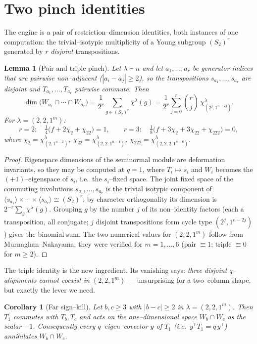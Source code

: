 \documentclass[11pt]{article}
\newtheorem{lemma}[theorem]{Lemma}
\newtheorem{corollary}[theorem]{Corollary}
\theoremstyle{definition}
\newcommand{\la}{\lambda}
\newcommand{\W}{W}
\begin{document}
\section{Two pinch identities}

The engine is a pair of restriction--dimension identities, both instances of one
computation: the trivial--isotypic multiplicity of a Young subgroup
$(S_2)^r$ generated by $r$ \emph{disjoint} transpositions.

\begin{lemma}[Pair and triple pinch]\label{lem:pinch}
Let $\la\vdash n$ and let $a_1,\dots,a_r$ be generator indices that are pairwise
non--adjacent \textup($|a_i-a_j|\ge2$\textup), so the transpositions $s_{a_1},\dots,s_{a_r}$ are
disjoint and $T_{a_1},\dots,T_{a_r}$ pairwise commute. Then
\[
\dim\bigl(\W_{a_1}\cap\cdots\cap\W_{a_r}\bigr)
=\frac1{2^r}\sum_{g\in(S_2)^r}\chi^\la(g)
=\frac1{2^r}\sum_{j=0}^r\binom rj\,\chi^\la_{(2^j,1^{n-2j})} .
\]
For $\la=(2,2,1^m)$:
\[
r=2:\quad \tfrac14\bigl(f+2\chi_2+\chi_{22}\bigr)=1,\qquad
r=3:\quad \tfrac18\bigl(f+3\chi_2+3\chi_{22}+\chi_{222}\bigr)=0,
\]
where $\chi_2=\chi^\la_{(2,1^{n-2})}$, $\chi_{22}=\chi^\la_{(2,2,1^{n-4})}$,
$\chi_{222}=\chi^\la_{(2,2,2,1^{n-6})}$.
\end{lemma}

\begin{proof}
Eigenspace dimensions of the seminormal module are deformation invariants, so they may be
computed at $q=1$, where $T_i\mapsto s_i$ and $\W_i$ becomes the $(+1)$--eigenspace of
$s_i$, i.e.\ the $s_i$--fixed space. The joint fixed space of the commuting involutions
$s_{a_1},\dots,s_{a_r}$ is the trivial isotypic component of
$\langle s_{a_1}\rangle\times\cdots\times\langle s_{a_r}\rangle\cong(S_2)^r$; by character
orthogonality its dimension is $2^{-r}\sum_{g}\chi^\la(g)$. Grouping $g$ by the number $j$
of its non--identity factors (each a transposition, all conjugate; $j$ disjoint
transpositions form cycle type $(2^j,1^{n-2j})$) gives the binomial sum. The two numerical
values for $(2,2,1^m)$ follow from Murnaghan--Nakayama; they were verified for $m=1,\dots,6$
(pair $\equiv1$; triple $\equiv0$ for $m\ge2$).
\end{proof}

The triple identity is the new ingredient. Its vanishing says: \emph{three disjoint
$q$--alignments cannot coexist in $(2,2,1^m)$} --- unsurprising for a two--column shape,
but exactly the lever we need.

\begin{corollary}[Far sign--kill]\label{cor:signkill}
Let $b,c\ge3$ with $|b-c|\ge2$ in $\la=(2,2,1^m)$. Then $T_1$ commutes with $T_b,T_c$ and
acts on the one--dimensional space $\W_b\cap\W_c$ as the scalar $-1$. Consequently every
$q$--eigen--covector $y$ of $T_1$ \textup(i.e.\ $y^{\mathsf T}T_1=q\,y^{\mathsf T}$\textup) annihilates
$\W_b\cap\W_c$.
\end{corollary}
\end{document}
